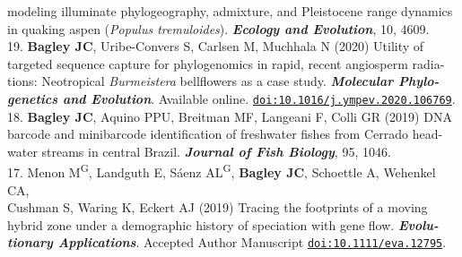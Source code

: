 \documentclass[margin,line]{res}
\begin{document}
\begin{resume}
\hspace*{8mm} modeling illuminate phylogeography, admixture, and Pleistocene range dynamics\\ \vspace{2mm}
\hspace*{8mm}in quaking aspen (\textit{Populus tremuloides}). {\it \textbf{Ecology and Evolution}}, 10, 4609.\\
19. \textbf{Bagley JC}, Uribe-Convers S, Carlsen M, Muchhala N (2020) Utility of\\
\hspace*{8mm} targeted sequence capture for phylogenomics in rapid, recent angiosperm radia-\\
\hspace*{8mm} tions: Neotropical \emph{Burmeistera} bellflowers as a case study. \textit{\textbf{Molecular Phylo-}\\ \vspace{2mm}
\hspace*{8mm}\textbf{genetics and Evolution}}. Available online. \href{doi:10.1016/j.ympev.2020.106769}{\tt doi:10.1016/j.ympev.2020.106769}.\\
18. \textbf{Bagley JC}, Aquino PPU, Breitman MF, Langeani F, Colli GR (2019) DNA\\
\hspace*{8mm} barcode and minibarcode identification of freshwater fishes from Cerrado head-\\ \vspace{2mm}
\hspace*{8mm}water streams in central Brazil. \textit{\textbf{Journal of Fish Biology}}, 95, 1046. \\
17. Menon M\textsuperscript{G}, Landguth E, S\'{a}enz AL\textsuperscript{G}, \textbf{Bagley JC}, Schoettle A, Wehenkel CA,\\ 
\hspace*{8mm} Cushman S, Waring K, Eckert AJ (2019) Tracing the footprints of a moving \\
\hspace*{8mm} hybrid zone under a demographic history of speciation with gene flow. \textit{\textbf{Evolu-}\\ \vspace{2mm}
\hspace*{8mm}\textbf{tionary Applications}}. Accepted Author Manuscript \href{doi:10.1111/eva.12795}{\tt doi:10.1111/eva.12795}.\\

\end{resume}
\end{document}
